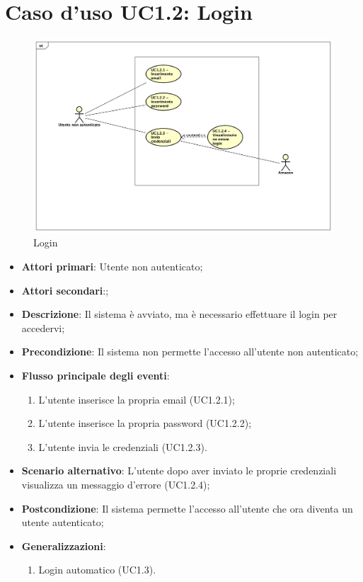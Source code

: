 \section{Caso d'uso UC1.2: Login}
\begin{figure} [h]
	\centering
	\includegraphics[scale=0.4]{./Diagram/UC1-2.png}
	\caption{Login}\label{}
\end{figure}
\begin{itemize}
	\item \textbf{Attori primari}: Utente non autenticato;
	\item \textbf{Attori secondari}:;
	\item \textbf{Descrizione}: Il sistema è avviato, ma è necessario effettuare il login per accedervi;
	\item \textbf{Precondizione}: Il sistema non permette l'accesso all'utente non autenticato;
	\item \textbf{Flusso principale degli eventi}:
	\begin{enumerate}
		\item L'utente inserisce la propria email (UC1.2.1);
		\item L'utente inserisce la propria password (UC1.2.2);
		\item L'utente invia le credenziali (UC1.2.3).
	\end{enumerate}
	\item \textbf{Scenario alternativo}: L'utente dopo aver inviato le proprie credenziali visualizza un messaggio d'errore (UC1.2.4);
	\item \textbf{Postcondizione}: Il sistema permette l'accesso all'utente che ora diventa un utente autenticato; 
	\item \textbf{Generalizzazioni}:
	\begin{enumerate}
		\item Login automatico (UC1.3).
	\end{enumerate}
\end{itemize}

